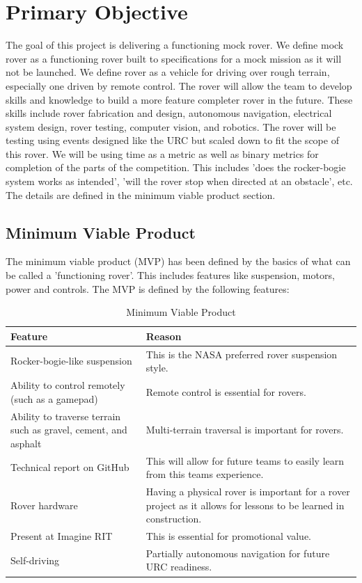\documentclass[conference]{IEEEtran} %
\begin{document}
\section{Primary Objective}
\label{sec:primary-obj}
The goal of this project is delivering a functioning mock rover.
We define mock rover as a functioning rover built to specifications for a mock mission as it will not be launched. 
We define rover as a vehicle for driving over rough terrain, especially one driven by remote control.
The rover will allow the team to develop skills and knowledge to build a
more feature completer rover in the future. 
These skills include rover fabrication and design, autonomous navigation, electrical system design, rover testing, computer vision, and robotics.
The rover will be testing using events designed like the URC but scaled down to fit the scope of this rover. 
We will be using time as a metric as well as binary metrics for completion of the parts of the competition. 
This includes ’does the rocker-bogie system works as intended’, ’will the rover stop when directed at an obstacle’, etc. 
The details are defined in the minimum viable product section.

\subsection{Minimum Viable Product}
\label{subsec:mvp}
The minimum viable product (MVP) has been defined by the basics of what can be called a 'functioning rover'. This includes features like suspension, motors, power and controls. The MVP is defined by the following features: 

\begin{table}[hb!]
    \caption{Minimum Viable Product}
    \centering
    {\renewcommand{\arraystretch}{1.5}
    \begin{tabularx}{\linewidth}{LL} 
    \hline
    \textbf{Feature} & \textbf{Reason} \\
    \hline
    Rocker-bogie-like suspension & This is the NASA preferred rover suspension style. \\
    Ability to control remotely (such as a gamepad) & Remote control is essential for rovers. \\
    Ability to traverse terrain such as gravel, cement, and asphalt & Multi-terrain traversal is important for rovers. \\
    Technical report on GitHub & This will allow for future teams to easily learn from this teams experience. \\
    Rover hardware & Having a physical rover is important for a rover project as it allows for lessons to be learned in construction. \\ 
    Present at Imagine RIT & This is essential for promotional value. \\
    Self-driving & Partially autonomous navigation for future URC readiness. \\
    \hline
    \end{tabularx}
    }
\label{tab:mvp-one}
\end{table}
\end{document}
